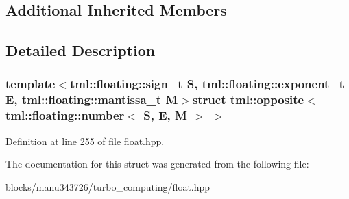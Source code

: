 \subsection*{Additional Inherited Members}


\subsection{Detailed Description}
\subsubsection*{template$<$tml\+::floating\+::sign\+\_\+t S, tml\+::floating\+::exponent\+\_\+t E, tml\+::floating\+::mantissa\+\_\+t M$>$struct tml\+::opposite$<$ tml\+::floating\+::number$<$ S, E, M $>$ $>$}



Definition at line 255 of file float.\+hpp.



The documentation for this struct was generated from the following file\+:\begin{DoxyCompactItemize}
\item 
blocks/manu343726/turbo\+\_\+computing/float.\+hpp\end{DoxyCompactItemize}
